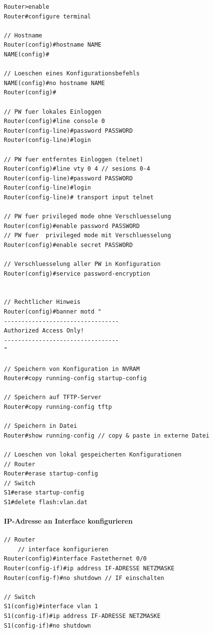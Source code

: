 \documentclass[a4paper,12pt]{article}
\begin{document}
\begin{lstlisting}
Router>enable
Router#configure terminal

// Hostname
Router(config)#hostname NAME
NAME(config)#

// Loeschen eines Konfigurationsbefehls
NAME(config)#no hostname NAME
Router(config)#

// PW fuer lokales Einloggen
Router(config)#line console 0
Router(config-line)#password PASSWORD
Router(config-line)#login

// PW fuer entferntes Einloggen (telnet)
Router(config)#line vty 0 4 // sesions 0-4
Router(config-line)#password PASSWORD
Router(config-line)#login
Router(config-line)# transport input telnet

// PW fuer privileged mode ohne Verschluesselung
Router(config)#enable password PASSWORD
// PW fuer  privileged mode mit Verschluesselung
Router(config)#enable secret PASSWORD

// Verschluesselung aller PW in Konfiguration
Router(config)#service password-encryption


// Rechtlicher Hinweis
Router(config)#banner motd "
---------------------------------
Authorized Access Only!
---------------------------------
"

// Speichern von Konfiguration in NVRAM
Router#copy running-config startup-config

// Speichern auf TFTP-Server
Router#copy running-config tftp

// Speichern in Datei
Router#show running-config // copy & paste in externe Datei

// Loeschen von lokal gespeicherten Konfigurationen
// Router
Router#erase startup-config
// Switch
S1#erase startup-config
S1#delete flash:vlan.dat

\end{lstlisting}

\paragraph{IP-Adresse an Interface konfigurieren}
\begin{lstlisting}
// Router
    // interface konfigurieren
Router(config)#interface Fastethernet 0/0
Router(config-if)#ip address IF-ADRESSE NETZMASKE
Router(config-f)#no shutdown // IF einschalten

// Switch
S1(config)#interface vlan 1
S1(config-if)#ip address IF-ADRESSE NETZMASKE
S1(config-if)#no shutdown
\end{lstlisting}
\end{document}
